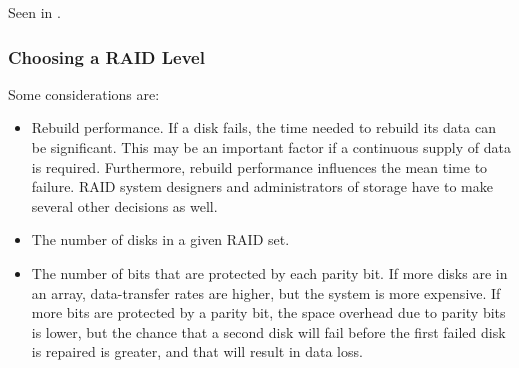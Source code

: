 Seen in .

\subsubsection{Choosing a RAID Level}\label{subsubsec:Choosing_RAID_Level}
Some considerations are:
\begin{itemize}[noitemsep]
\item Rebuild performance.
  If a disk fails, the time needed to rebuild its data can be significant.
  This may be an important factor if a continuous supply of data is required.
  Furthermore, rebuild performance influences the mean time to failure.
  RAID system designers and administrators of storage have to make several other decisions as well.

\item The number of disks in a given RAID set.

\item The number of bits that are protected by each parity bit.
  If more disks are in an array, data-transfer rates are higher, but the system is more expensive.
  If more bits are protected by a parity bit, the space overhead due to parity bits is lower, but the chance that a second disk will fail before the first failed disk is repaired is greater, and that will result in data loss.
\end{itemize}

